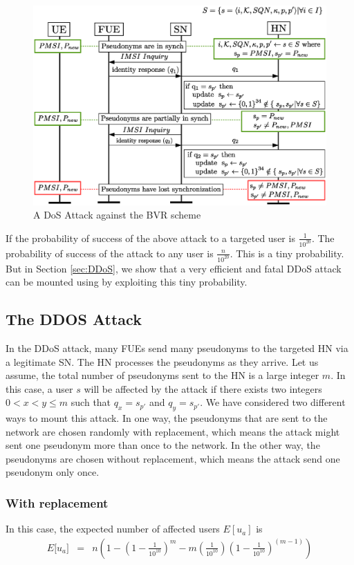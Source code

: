 \documentclass{llncs} %
\begin{document}
\begin{figure}[]
  \centering
    \includegraphics[width=\textwidth]{DDoS.eps}
  \caption{A DoS Attack against the BVR scheme}
  \label{fig:dos_attack}	
\end{figure}

If the probability of success of the above attack to a targeted user is $\frac{1}{10^{20}}$. The probability of   success of the attack to any user is $\frac{n}{10^{20}}$. This is a tiny probability. But in Section \ref{sec:DDoS}, we show that a very efficient and fatal DDoS attack can be mounted using by exploiting this tiny probability.

\subsection{The DDOS Attack}
In the DDoS attack, many FUEs send many pseudonyms to the targeted HN via a legitimate SN. The HN processes the pseudonyms as they arrive. Let us assume, the total number of pseudonyms sent to the HN is a large integer $m$. In this case, a user $s$ will be affected by the attack if there exists two integers $0 < x < y \leq m$ such that $q_{x} = s_{p'}$ and $q_{y} = s_{p'}$. We have considered two different ways to mount this attack. In one way, the pseudonyms that are sent to the network are chosen randomly with replacement, which means the attack might sent one pseudonym more than once to the network. In the other way, the pseudonyms are chosen without replacement, which means the attack send one pseudonym only once.

\subsubsection{With replacement}
In this case, the expected number of affected users $E[u_a]$ is
\begin{eqnarray}
E\big[ u_a \big] &=& n\left(1- \left(1 - \frac{1}{10^{10}}\right)^m - m\left(\frac{1}{10^{10}}\right)\left(1 - \frac{1}{10^{10}}\right)^{\left(m-1 \right)} \right)
\end{eqnarray} 
\end{document}
